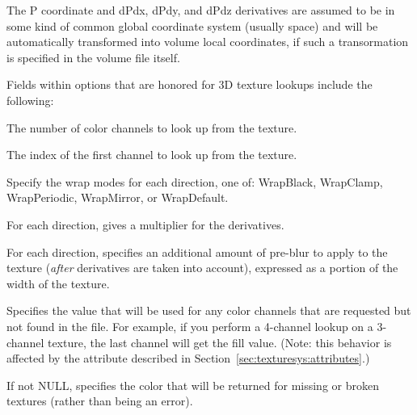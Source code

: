 The {\cf P} coordinate and {\cf dPdx}, {\cf dPdy}, and {\cf dPdz}
derivatives are assumed to be in some kind of common global coordinate
system (usually  space) and will be automatically transformed
into volume local coordinates, if such a transormation is specified in
the volume file itself.

Fields within {\cf options} that are honored for 3D texture lookups
include the following:

\vspace{-12pt}
\vspace{10pt}
The number of color channels to look up from the texture.
\apiend

\vspace{-24pt}
\vspace{10pt}
The index of the first channel to look up from the texture.
\apiend

\vspace{-24pt}
\vspace{10pt}
Specify the wrap modes for each direction, one of: 
{\cf WrapBlack}, {\cf WrapClamp}, {\cf WrapPeriodic}, {\cf WrapMirror},
or {\cf WrapDefault}.
\apiend

\vspace{-24pt}
\vspace{10pt}
For each direction, gives a multiplier for the derivatives.
\apiend

\vspace{-24pt}
\vspace{10pt}
For each direction, specifies an additional amount of pre-blur to apply
to the texture (\emph{after} derivatives are taken into account),
expressed as a portion of the width of the texture.
\apiend

\vspace{-24pt}
\vspace{10pt}
Specifies the value that will be used for any color channels that are
requested but not found in the file.  For example, if you perform a
4-channel lookup on a 3-channel texture, the last channel will
get the fill value.  (Note: this behavior is affected by the
 attribute described in 
Section~\ref{sec:texturesys:attributes}.)
\apiend

\vspace{-24pt}
\vspace{10pt}
If not NULL, specifies the color that will be returned for missing or
broken textures (rather than being an error).
\apiend

